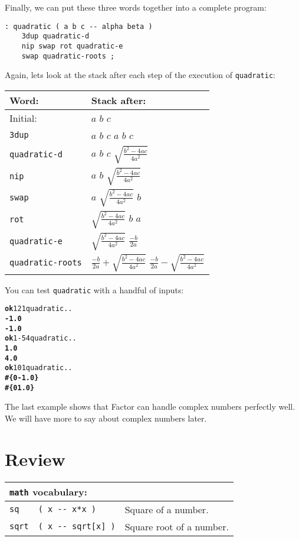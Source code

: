 \documentclass[english]{book}
\newcommand{\wordtable}[1]{{
\begin{tabularx}{12cm}{|l l X|}
#1
\hline
\end{tabularx}}}
\newcommand{\tabvocab}[1]{
\hline
\multicolumn{3}{|l|}{
\rule[-2mm]{0mm}{6mm}
\texttt{#1} vocabulary:}
\\
\hline
}
\begin{document}
Finally, we can put these three words together into a complete program:

\begin{verbatim}
: quadratic ( a b c -- alpha beta )
    3dup quadratic-d
    nip swap rot quadratic-e
    swap quadratic-roots ;
\end{verbatim}

Again, lets look at the stack after each step of the execution of \texttt{quadratic}:

\begin{tabular}{|l|l|}
\hline
Word:&Stack after:\\
\hline
Initial:&$a$ $b$ $c$\\
\hline
\texttt{3dup}&$a$ $b$ $c$ $a$ $b$ $c$\\
\hline
\texttt{quadratic-d}&$a$ $b$ $c$ $\sqrt{\frac{b^2-4ac}{4a^2}}$\\
\hline
\texttt{nip}&$a$ $b$ $\sqrt{\frac{b^2-4ac}{4a^2}}$\\
\hline
\texttt{swap}&$a$ $\sqrt{\frac{b^2-4ac}{4a^2}}$ $b$ \\
\hline
\texttt{rot}&$\sqrt{\frac{b^2-4ac}{4a^2}}$ $b$ $a$ \\
\hline
\texttt{quadratic-e}&$\sqrt{\frac{b^2-4ac}{4a^2}}$ $\frac{-b}{2a}$\\
\hline
\texttt{quadratic-roots}&$\frac{-b}{2a}+\sqrt{\frac{b^2-4ac}{4a^2}}$ $\frac{-b}{2a}-\sqrt{\frac{b^2-4ac}{4a^2}}$\\
\hline
\end{tabular}

You can test \texttt{quadratic} with a handful of inputs:

\begin{alltt}
\textbf{ok} 1 2 1 quadratic . .
\textbf{-1.0}
\textbf{-1.0}
\textbf{ok} 1 -5 4 quadratic . .
\textbf{1.0}
\textbf{4.0}
\textbf{ok} 1 0 1 quadratic . .
\textbf{#\{ 0 -1.0 \}
#\{ 0 1.0 \}}
\end{alltt}

The last example shows that Factor can handle complex numbers perfectly well. We will have more to say about complex numbers later.

\section*{Review}

\wordtable{
\tabvocab{math}
\texttt{sq}&
\texttt{( x -{}- x*x )}&
Square of a number.\\
\texttt{sqrt}&
\texttt{( x -{}- sqrt[x] )}&
Square root of a number.\\
}
\end{document}
